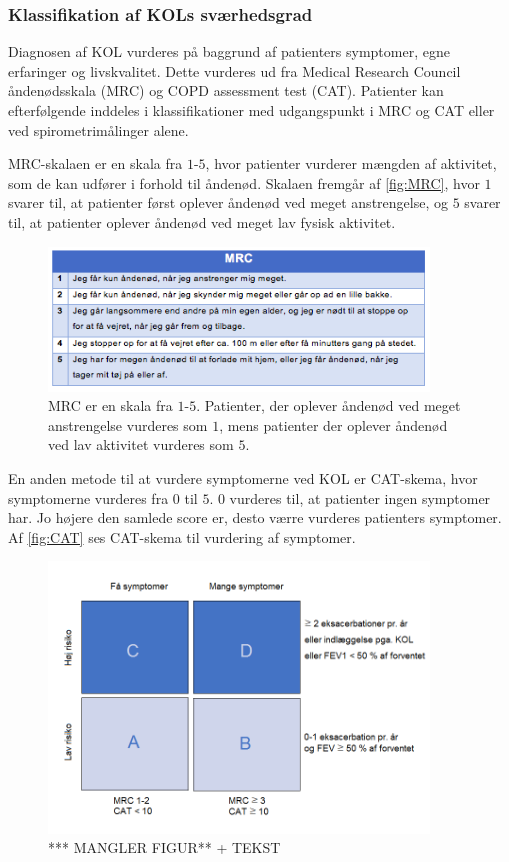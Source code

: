 \subsubsection{Klassifikation af KOLs sværhedsgrad}
Diagnosen af KOL vurderes på baggrund af patienters symptomer, egne erfaringer og livskvalitet. Dette vurderes ud fra Medical Research Council åndenødsskala (MRC) og COPD assessment test (CAT). Patienter kan efterfølgende inddeles i klassifikationer med udgangspunkt i MRC og CAT eller ved spirometrimålinger alene.\cite{Basisbogen2016}

 
MRC-skalaen er en skala fra $1$-$5$, hvor patienter vurderer mængden af aktivitet, som de kan udfører i forhold til åndenød. Skalaen fremgår af \autoref{fig:MRC}, hvor $1$ svarer til, at patienter først oplever åndenød ved meget anstrengelse, og $5$ svarer til, at patienter oplever åndenød ved meget lav fysisk aktivitet. \cite{Basisbogen2016}

\begin{figure} [H]
\centering
\includegraphics[width=0.9\textwidth]{figures/MRC}
\caption{MRC er en skala fra $1$-$5$. Patienter, der oplever åndenød ved meget anstrengelse vurderes som $1$, mens patienter der oplever åndenød ved lav aktivitet vurderes som $5$.}
\label{fig:MRC}
\end{figure} 

\noindent
En anden metode til at vurdere symptomerne ved KOL er  CAT-skema, hvor symptomerne vurderes fra $0$ til $5$. $0$ vurderes til, at patienter ingen symptomer har. Jo højere den samlede score er, desto værre vurderes patienters symptomer. Af \autoref{fig:CAT} ses CAT-skema til vurdering af symptomer.\cite{Basisbogen2016, dsam2016}

\begin{figure} [H]
\centering
\includegraphics[width=0.9\textwidth]{figures/KAT}
\caption{*** MANGLER FIGUR** + TEKST}
\label{fig:CAT}
\end{figure} 



